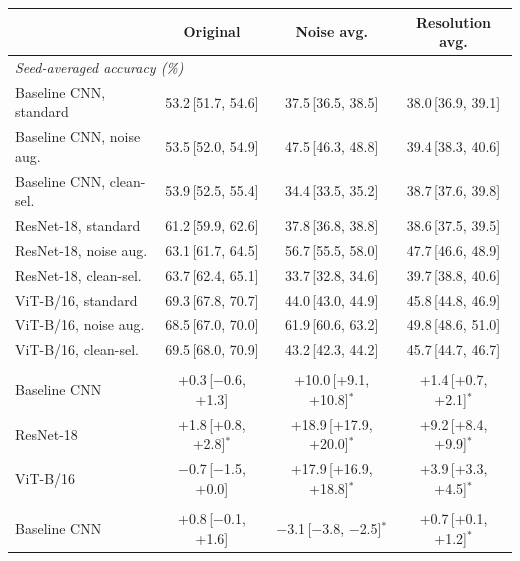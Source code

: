 \begin{tabular}{lccc}
\toprule
 & Original & Noise avg. & Resolution avg. \\
\midrule
\multicolumn{4}{l}{\emph{Seed-averaged accuracy (\%)}} \\
Baseline CNN, standard & 53.2{\scriptsize\,[51.7, 54.6]} & 37.5{\scriptsize\,[36.5, 38.5]} & 38.0{\scriptsize\,[36.9, 39.1]} \\
Baseline CNN, noise aug. & 53.5{\scriptsize\,[52.0, 54.9]} & 47.5{\scriptsize\,[46.3, 48.8]} & 39.4{\scriptsize\,[38.3, 40.6]} \\
Baseline CNN, clean-sel. & 53.9{\scriptsize\,[52.5, 55.4]} & 34.4{\scriptsize\,[33.5, 35.2]} & 38.7{\scriptsize\,[37.6, 39.8]} \\
ResNet-18, standard & 61.2{\scriptsize\,[59.9, 62.6]} & 37.8{\scriptsize\,[36.8, 38.8]} & 38.6{\scriptsize\,[37.5, 39.5]} \\
ResNet-18, noise aug. & 63.1{\scriptsize\,[61.7, 64.5]} & 56.7{\scriptsize\,[55.5, 58.0]} & 47.7{\scriptsize\,[46.6, 48.9]} \\
ResNet-18, clean-sel. & 63.7{\scriptsize\,[62.4, 65.1]} & 33.7{\scriptsize\,[32.8, 34.6]} & 39.7{\scriptsize\,[38.8, 40.6]} \\
ViT-B/16, standard & 69.3{\scriptsize\,[67.8, 70.7]} & 44.0{\scriptsize\,[43.0, 44.9]} & 45.8{\scriptsize\,[44.8, 46.9]} \\
ViT-B/16, noise aug. & 68.5{\scriptsize\,[67.0, 70.0]} & 61.9{\scriptsize\,[60.6, 63.2]} & 49.8{\scriptsize\,[48.6, 51.0]} \\
ViT-B/16, clean-sel. & 69.5{\scriptsize\,[68.0, 70.9]} & 43.2{\scriptsize\,[42.3, 44.2]} & 45.7{\scriptsize\,[44.7, 46.7]} \\
\addlinespace
\multicolumn{4}{l}{\emph{Noise augmentation minus standard training (points)}} \\
Baseline CNN & +0.3{\scriptsize\,[$-$0.6, +1.3]} & +10.0{\scriptsize\,[+9.1, +10.8]}$^{*}$ & +1.4{\scriptsize\,[+0.7, +2.1]}$^{*}$ \\
ResNet-18 & +1.8{\scriptsize\,[+0.8, +2.8]}$^{*}$ & +18.9{\scriptsize\,[+17.9, +20.0]}$^{*}$ & +9.2{\scriptsize\,[+8.4, +9.9]}$^{*}$ \\
ViT-B/16 & $-$0.7{\scriptsize\,[$-$1.5, +0.0]} & +17.9{\scriptsize\,[+16.9, +18.8]}$^{*}$ & +3.9{\scriptsize\,[+3.3, +4.5]}$^{*}$ \\
\addlinespace
\multicolumn{4}{l}{\emph{Clean-selected minus score-selected checkpoint (points)}} \\
Baseline CNN & +0.8{\scriptsize\,[$-$0.1, +1.6]} & $-$3.1{\scriptsize\,[$-$3.8, $-$2.5]}$^{*}$ & +0.7{\scriptsize\,[+0.1, +1.2]}$^{*}$ \\

\end{tabular}

